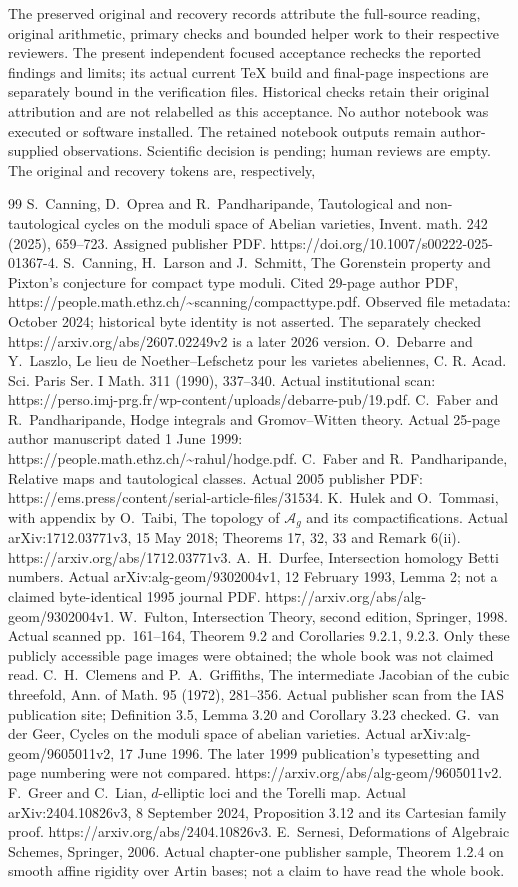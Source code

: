 \documentclass[10pt]{article}
\begin{document}
The preserved original and recovery records attribute the full-source reading, original arithmetic, primary checks and bounded helper work to their respective reviewers. The present independent focused acceptance rechecks the reported findings and limits; its actual current TeX build and final-page inspections are separately bound in the verification files. Historical checks retain their original attribution and are not relabelled as this acceptance. No author notebook was executed or software installed. The retained notebook outputs remain author-supplied observations. Scientific decision is pending; human reviews are empty. The original and recovery tokens are, respectively,\par
99 S. Canning, D. Oprea and R. Pandharipande, Tautological and non-tautological cycles on the moduli space of Abelian varieties, Invent. math. 242 (2025), 659–723. Assigned publisher PDF. https://doi.org/10.1007/s00222-025-01367-4. S. Canning, H. Larson and J. Schmitt, The Gorenstein property and Pixton’s conjecture for compact type moduli. Cited 29-page author PDF, https://people.math.ethz.ch/\textasciitilde{}scanning/compacttype.pdf. Observed file metadata: October 2024; historical byte identity is not asserted. The separately checked https://arxiv.org/abs/2607.02249v2 is a later 2026 version. O. Debarre and Y. Laszlo, Le lieu de Noether–Lefschetz pour les varietes abeliennes, C. R. Acad. Sci. Paris Ser. I Math. 311 (1990), 337–340. Actual institutional scan: https://perso.imj-prg.fr/wp-content/uploads/debarre-pub/19.pdf. C. Faber and R. Pandharipande, Hodge integrals and Gromov–Witten theory. Actual 25-page author manuscript dated 1 June 1999: https://people.math.ethz.ch/\textasciitilde{}rahul/hodge.pdf. C. Faber and R. Pandharipande, Relative maps and tautological classes. Actual 2005 publisher PDF: https://ems.press/content/serial-article-files/31534. K. Hulek and O. Tommasi, with appendix by O. Taibi, The topology of \(\mathcal A_g\) and its compactifications. Actual arXiv:1712.03771v3, 15 May 2018; Theorems 17, 32, 33 and Remark 6(ii). https://arxiv.org/abs/1712.03771v3. A. H. Durfee, Intersection homology Betti numbers. Actual arXiv:alg-geom/9302004v1, 12 February 1993, Lemma 2; not a claimed byte-identical 1995 journal PDF. https://arxiv.org/abs/alg-geom/9302004v1. W. Fulton, Intersection Theory, second edition, Springer, 1998. Actual scanned pp. 161–164, Theorem 9.2 and Corollaries 9.2.1, 9.2.3. Only these publicly accessible page images were obtained; the whole book was not claimed read. C. H. Clemens and P. A. Griffiths, The intermediate Jacobian of the cubic threefold, Ann. of Math. 95 (1972), 281–356. Actual publisher scan from the IAS publication site; Definition 3.5, Lemma 3.20 and Corollary 3.23 checked. G. van der Geer, Cycles on the moduli space of abelian varieties. Actual arXiv:alg-geom/9605011v2, 17 June 1996. The later 1999 publication’s typesetting and page numbering were not compared. https://arxiv.org/abs/alg-geom/9605011v2. F. Greer and C. Lian, \(d\)-elliptic loci and the Torelli map. Actual arXiv:2404.10826v3, 8 September 2024, Proposition 3.12 and its Cartesian family proof. https://arxiv.org/abs/2404.10826v3. E. Sernesi, Deformations of Algebraic Schemes, Springer, 2006. Actual chapter-one publisher sample, Theorem 1.2.4 on smooth affine rigidity over Artin bases; not a claim to have read the whole book.\par
\end{document}
